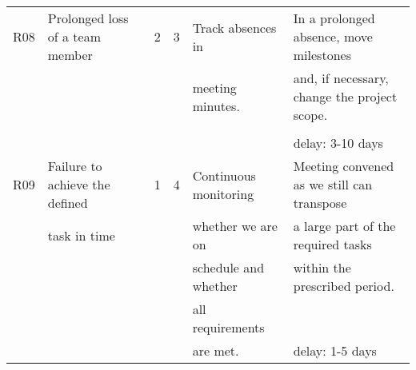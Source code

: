 \begin{center}
\begin{longtable}{|p{6mm}|p{30mm}|p{6mm}|p{8mm}|p{30mm}|p{64mm}|}
	R08 & Prolonged loss of a team member  	& \cellcolor{yellow!50}2  	& \cellcolor{yellow!50}3 	& Track absences in	& In a prolonged absence, move milestones	\\
		&									& \cellcolor{yellow!50}  	& \cellcolor{yellow!50} 	& meeting minutes. 	& and, if necessary, change the project scope. \\
		&									& \cellcolor{yellow!50}  	& \cellcolor{yellow!50} 	& 					&												\\
		&									& \cellcolor{yellow!50}  	& \cellcolor{yellow!50} 	& 					& delay: 3-10 days 								\\ \hline	
		
	R09 & Failure to achieve the defined	& \cellcolor{yellow!50}1 	& \cellcolor{yellow!50}4 	& Continuous monitoring & Meeting convened as we still can transpose \\
		& task in time 						& \cellcolor{yellow!50} 	& \cellcolor{yellow!50} 	&  whether we are on 	& a large part of the required tasks 		\\
		& 			 						& \cellcolor{yellow!50} 	& \cellcolor{yellow!50} 	&  schedule and whether & within the prescribed period.				\\
		& 			 						& \cellcolor{yellow!50} 	& \cellcolor{yellow!50} 	&  all requirements 	&											\\
		& 			 						& \cellcolor{yellow!50} 	& \cellcolor{yellow!50} 	&  are met. 			& delay: 1-5 days 							\\ \hline
		
   \end{longtable}
\end{center}

